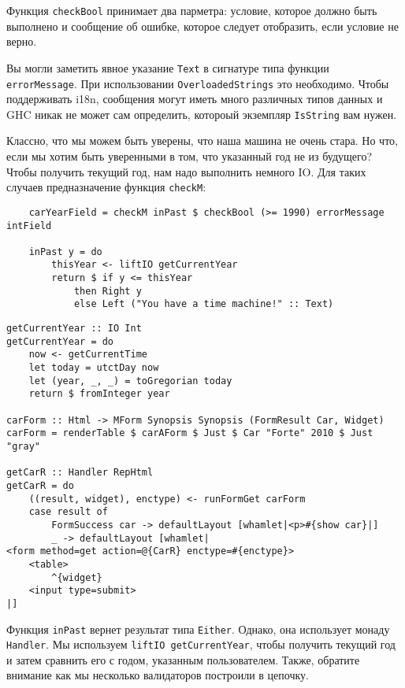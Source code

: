 Функция \lstinline'checkBool' принимает два парметра: условие, которое должно быть
выполнено и сообщение об ошибке, которое следует отобразить, если условие не верно.
\begin{remark}
Вы могли заметить явное указание \lstinline'Text' в сигнатуре типа функции
\lstinline'errorMessage'. При использовании \lstinline'OverloadedStrings' это
необходимо. Чтобы поддерживать i18n, сообщения могут иметь много различных типов
данных и GHC никак не может сам определить, котороый экземпляр \lstinline'IsString' вам
нужен.
\end{remark}
Классно, что мы можем быть уверены, что наша машина не очень стара. Но что, если мы хотим
быть уверенными в том, что указанный год не из будущего? Чтобы получить текущий год, нам
надо выполнить немного IO. Для таких случаев предназначение функция \lstinline'checkM':

\begin{lstlisting}
    carYearField = checkM inPast $ checkBool (>= 1990) errorMessage intField

    inPast y = do
        thisYear <- liftIO getCurrentYear
        return $ if y <= thisYear
            then Right y
            else Left ("You have a time machine!" :: Text)
\end{lstlisting}

\begin{lstlisting}
getCurrentYear :: IO Int
getCurrentYear = do
    now <- getCurrentTime
    let today = utctDay now
    let (year, _, _) = toGregorian today
    return $ fromInteger year

carForm :: Html -> MForm Synopsis Synopsis (FormResult Car, Widget)
carForm = renderTable $ carAForm $ Just $ Car "Forte" 2010 $ Just "gray"

getCarR :: Handler RepHtml
getCarR = do
    ((result, widget), enctype) <- runFormGet carForm
    case result of
        FormSuccess car -> defaultLayout [whamlet|<p>#{show car}|]
        _ -> defaultLayout [whamlet|
<form method=get action=@{CarR} enctype=#{enctype}>
    <table>
        ^{widget}
    <input type=submit>
|]
\end{lstlisting}

Функция \lstinline'inPast' вернет результат типа \lstinline'Either'. Однако, она
использует монаду \lstinline'Handler'. Мы используем \lstinline'liftIO getCurrentYear',
чтобы получить текущий год и затем сравнить его с годом, указанным пользователем. Также,
обратите внимание как мы несколько валидаторов построили в цепочку.

